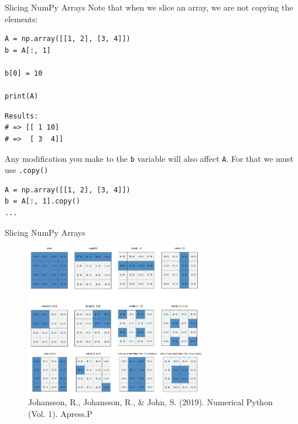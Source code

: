 \documentclass[10pt]{beamer}
\begin{document}
\begin{frame}[label={sec:org8127d5f},fragile]{Slicing NumPy Arrays}
 Note that when we slice an array, we are \alert{not copying} the elements:

\begin{verbatim}
A = np.array([[1, 2], [3, 4]])
b = A[:, 1]

b[0] = 10

print(A)
\end{verbatim}

\begin{verbatim}
Results: 
# => [[ 1 10]
# =>  [ 3  4]]
\end{verbatim}


Any modification you make to the \texttt{b} variable will also affect \texttt{A}. For that we must use
\texttt{.copy()}

\begin{verbatim}
A = np.array([[1, 2], [3, 4]])
b = A[:, 1].copy()
...
\end{verbatim}
\end{frame}

\begin{frame}[label={sec:org3e63a7e}]{Slicing NumPy Arrays}
\begin{figure}[htbp]
\centering
\includegraphics[width=0.7\textwidth]{./images/indexing.png}
\caption{Johansson, R., Johansson, R., \& John, S. (2019). Numerical Python (Vol. 1). Apress.P}
\end{figure}
\end{frame}
\end{document}

